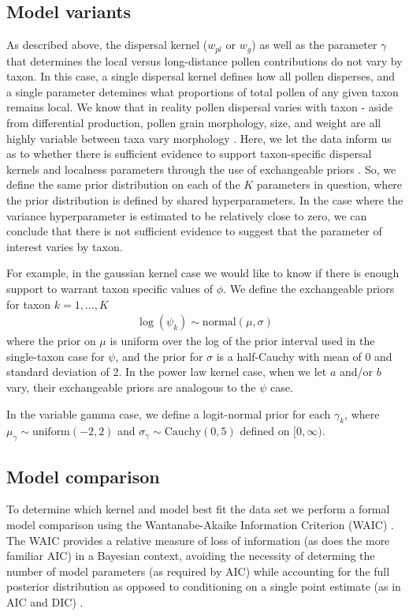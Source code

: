 \documentclass[12pt]{article}
\begin{document}
\subsection{Model variants}

As described above, the dispersal kernel ($w_{pl}$ or $w_g$) as well
as the parameter $\gamma$ that determines the local versus
long-distance pollen contributions do not vary by taxon. In this case,
a single dispersal kernel defines how all pollen disperses, and a
single parameter detemines what proportions of total pollen of any
given taxon remains local. We know that in reality pollen dispersal
varies with taxon - aside from differential production, pollen grain
morphology, size, and weight are all highly variable between taxa vary
morphology \cite{XXX}. Here, we let the data inform us as to whether
there is sufficient evidence to support taxon-specific dispersal
kernels and localness parameters through the use of exchangeable
priors \cite{XXX}. So, we define the same prior distribution on each of the $K$
parameters in question, where the prior distribution is defined by
shared hyperparameters. In the case where the variance hyperparameter
is estimated to be relatively close to zero, we can conclude that
there is not sufficient evidence to suggest that the parameter of
interest varies by taxon.

For example, in the gaussian kernel case we would like to know
if there is enough support to warrant taxon specific values of
$\phi$. We define the exchangeable priors for taxon $k=1, \ldots, K$
\begin{align}
\log(\psi_k) \sim \text{normal}( \mu, \sigma)
\end{align}
where the prior on $\mu$ is uniform over the log of the prior interval
used in the single-taxon case for $\psi$, and the prior for $\sigma$
is a half-Cauchy with mean of 0 and standard deviation of 2. In the
power law kernel case, when we let $a$ and/or $b$ vary, their exchangeable
priors are analogous to the $\psi$ case.

In the variable gamma case, we define a logit-normal prior for each
$\gamma_k$, where $\mu_{\gamma} \sim \text{uniform}(-2, 2)$ and $\sigma_{\gamma}
\sim \text{Cauchy}(0,5)$ defined on $[0,\infty)$.

\subsection{Model comparison}

To determine which kernel and model best fit the data set we perform a
formal model comparison using the Wantanabe-Akaike Information
Criterion (WAIC) \cite{XXX}. The WAIC provides a relative measure of
loss of information (as does the more familiar AIC) in a Bayesian
context, avoiding the necessity of determing the number of model
parameters (as required by AIC) while accounting for the full
posterior distribution as opposed to conditioning on a single point
estimate (as in AIC and DIC) \cite{XXX}. 
\end{document}
